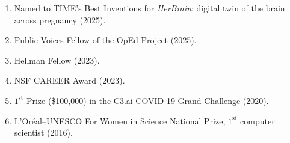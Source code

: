 \begin{enumerate}[leftmargin=*,itemsep=0.2em,topsep=0.2em,parsep=0pt,partopsep=0pt]
    \item Named to TIME's Best Inventions for \textit{HerBrain}: digital twin of the brain across pregnancy (2025).
    \item Public Voices Fellow of the OpEd Project (2025).
    \item Hellman Fellow (2023).
    \item NSF CAREER Award (2023).
    \item $1^{\text{st}}$ Prize (\$100,000) in the C3.ai COVID-19 Grand Challenge (2020).
    \item L'Or\'eal--UNESCO For Women in Science National Prize, $1^{\text{st}}$ computer scientist (2016).
\end{enumerate}